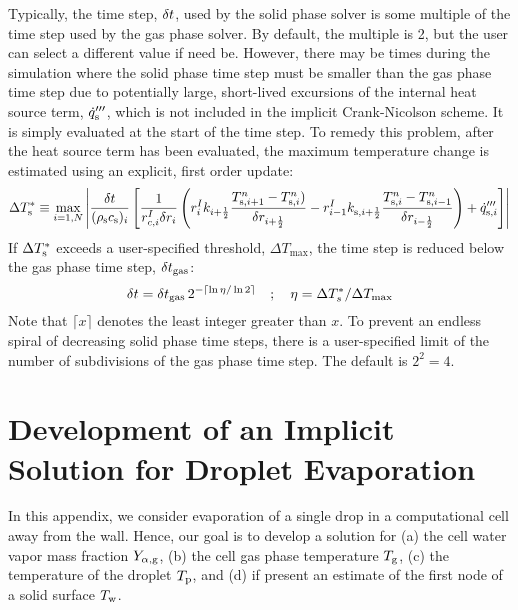 Typically, the time step, $\delta t$, used by the solid phase solver is some multiple of the time step used by the gas phase solver. By default, the multiple is 2, but the user can select a different value if need be. However, there may be times during the simulation where the solid phase time step must be smaller than the gas phase time step due to potentially large, short-lived excursions of the internal heat source term, $\dot{q}_{\rm s}'''$, which is not included in the implicit Crank-Nicolson scheme. It is simply evaluated at the start of the time step. To remedy this problem, after the heat source term has been evaluated, the maximum temperature change is estimated using an explicit, first order update:
\begin{equation}
  \Delta T_{\rm s}^* \equiv \max_{i=1,N} \left| \frac{\delta t}{(\rho_{\rm s} c_{\rm s})_i} \left[ \frac{1}{r_{c,i}^I \delta r_i} \left( r_{i}^I k_{i+\frac{1}{2}} \frac{T_{{\rm s},i+1}^n-T_{{\rm s},i}^n)}{\delta r_{i+\frac{1}{2}}} - r_{i-1}^I k_{{\rm s},i+\frac{1}{2}} \frac{T_{{\rm s},i}^n-T_{{\rm s},i-1}^n}{\delta r_{i-\frac{1}{2}}} \right) + \dot{q}_{{\rm s},i}''' \right] \right|
\end{equation}
If $\Delta T_{\rm s}^*$ exceeds a user-specified threshold, $\Delta T_{\max}$, the time step is reduced below the gas phase time step, $\delta t_{\rm gas}$:
\begin{equation}
   \delta t = \delta t_{\rm gas} \, 2^{-\lceil \ln \eta / \ln 2 \rceil }  \quad ; \quad \eta = \Delta T_{s}^*  / \Delta T_{\max}
\end{equation}
Note that $\lceil x \rceil$ denotes the least integer greater than $x$. To prevent an endless spiral of decreasing solid phase time steps, there is a user-specified limit of the number of subdivisions of the gas phase time step. The default is $2^2=4$.

\chapter{Development of an Implicit Solution for Droplet Evaporation}
\label{app_drop_evaporation}

In this appendix, we consider evaporation of a single drop in a computational cell away from the wall.  Hence, our goal is to develop a solution for (a) the cell water vapor mass fraction $Y_{\rm \alpha, g}$, (b) the cell gas phase temperature $T_{\rm g}$, (c) the temperature of the droplet $T_{\rm p}$, and (d) if present an estimate of the first node of a solid surface $T_{\rm w}$.


